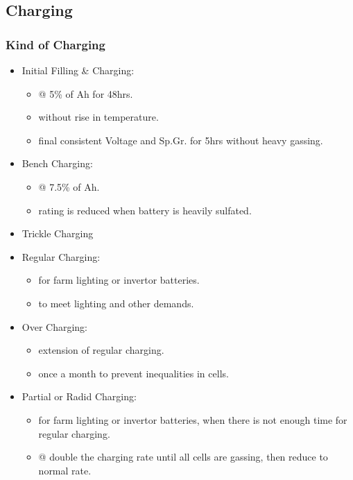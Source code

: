 \documentclass{beamer}
\begin{document}
\subsection{Charging}         %

\begin{frame}     %
  \frametitle{Kind of Charging}
  \fontsize{7pt}{10}\selectfont
  \vspace{-8pt}
  \begin{itemize}
    \item Initial Filling \& Charging:
    \begin{itemize}
      \fontsize{7pt}{10}\selectfont
      \item @ 5\% of Ah for 48hrs.
      \item without rise in temperature.
      \item final consistent Voltage and Sp.Gr. for 5hrs without heavy gassing.
    \end{itemize}
    \item Bench Charging:
    \begin{itemize}
      \fontsize{7pt}{10}\selectfont
      \item @ 7.5\% of Ah.
      \item rating is reduced when battery is heavily sulfated.
    \end{itemize}
    \item Trickle Charging
    \item Regular Charging:
    \begin{itemize}
      \fontsize{7pt}{10}\selectfont
      \item for farm lighting or invertor batteries.
      \item to meet lighting and other demands.
    \end{itemize}
    \item Over Charging:
    \begin{itemize}
      \fontsize{7pt}{10}\selectfont
      \item extension of regular charging.
      \item once a month to prevent inequalities in cells.
    \end{itemize}
    \item Partial or Radid Charging:
    \begin{itemize}
      \fontsize{7pt}{12}\selectfont
      \item for farm lighting or invertor batteries, when there is not enough time for regular charging.
      \item @ double the charging rate until all cells are gassing, then reduce to normal rate.
    \end{itemize}    
  \end{itemize}
\end{frame}
\end{document}
